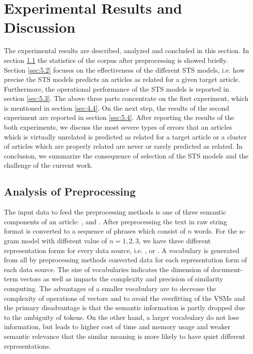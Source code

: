 
\section{Experimental Results and Discussion}
\label{sec:5}

The experimental results are described, analyzed and concluded in this section. In section \ref{sec:5.1} the statistics of the corpus after preprocessing is showed briefly. Section \ref{sec:5.2} focuses on the effectiveness of the different STS models, i.e. how precise the STS models predicts an articles as related for a given target article. Furthermore, the operational performance of the STS models is reported in section \ref{sec:5.3}. The above three parts concentrate on the first experiment, which is mentioned in section \ref{sec:4.4}. On the next step, the results of the second experiment are reported in section \ref{sec:5.4}. After reporting the results of the both experiments, we discuss the most severe types of errors that an articles which is virtually unrelated is predicted as related for a target article or a cluster of articles which are properly related are never or rarely predicted as related. In conclusion, we summarize the consequence of selection of the STS models and the challenge of the current work. 

\subsection{Analysis of Preprocessing}
\label{sec:5.1}

The input data to feed the preprocessing methods is one of three semantic components of an article: \ititle{}, \isummary{} and \icontent{}. After preprocessing the text in raw string format is converted to a sequence of phrases which consist of $n$ words. For the n-gram model with different value of $n = 1, 2, 3$, we have three different representation forms for every data source, i.e. \ititle{}, \isummary{} or \icontent{}. A vocabulary is generated from all by preprocessing methods converted data for each representation form of each data source. The size of vocabularies indicates the dimension of document-term vectors as well as impacts the complexity and precision of similarity computing. The advantages of a smaller vocabulary are to decrease the complexity of operations of vectors and to avoid the overfitting of the VSMs and the primary disadvantage is that the semantic information is partly dropped due to the ambiguity of tokens. On the other hand, a larger vocabulary do not lose information, but leads to higher cost of time and memory usage and weaker semantic relevance that the similar meaning is more likely to have quiet different representations. 

